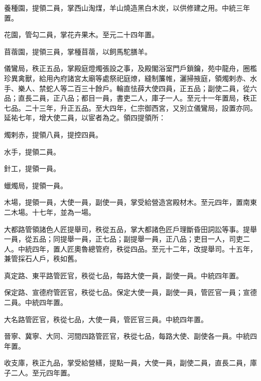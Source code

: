 \begin{pinyinscope}
 養種園，提領二員，掌西山淘煤，羊山燒造黑白木炭，以供修建之用。中統三年置。



 花園，管勾二員，掌花卉果木。至元二十四年置。



 苜蓿園，提領三員，掌種苜蓿，以飼馬駝膳羊。



 儀鸞局，秩正五品，掌殿庭燈燭張設之事，及殿閣浴室門戶鎖鑰，苑中龍舟，圈檻珍異禽獸，給用內府諸宮太廟等處祭祀庭燎，縫制簾帷，灑掃掖庭，領燭剌赤、水手、樂人、禁蛇人等二百三十餘戶。輪直怯薛大使四員，正五品；副使二員，從六品；直長二員，正八品；都目一員，書吏二人，庫子一人。至元十一年置局，秩正七品。二十三年，升正五品。至大四年，仁宗御西宮，又別立儀鸞局，設置亦同。延祐七年，增大使二員，以宦者為之。領四提領所：



 燭剌赤，提領八員，提控四員。



 水手，提領二員。



 針工，提領一員。



 蠟燭局，提領一員。



 木場，提領一員，大使一員，副使一員，掌受給營造宮殿材木。至元四年，置南東二木場。十七年，並為一場。



 大都路管領諸色人匠提舉司，秩從五品，掌大都諸色匠戶理斷昏田詞訟等事。提舉一員，從五品；同提舉一員，正七品；副提舉一員，正八品；吏目一人，司吏二人。中統四年，置人匠奧魯總管府，秩從四品。至元十二年，改提舉司。十五年，兼管採石人戶，秩如舊。



 真定路、東平路管匠官，秩從七品，每路大使一員，副使一員。中統四年置。



 保定路、宣德府管匠官，秩從七品。保定大使一員，副使一員，管匠官一員；宣德二員。中統四年置。



 大名路管匠官，秩從七品，大使一員，管匠官三員。中統四年置。



 晉寧、冀寧、大同、河間四路管匠官，秩從七品，每路大使、副使各一員。中統四年置。



 收支庫，秩正九品，掌受給營繕，提點一員，大使一員，副使二員，直長二員，庫子二人。至元四年置。




\end{pinyinscope}
